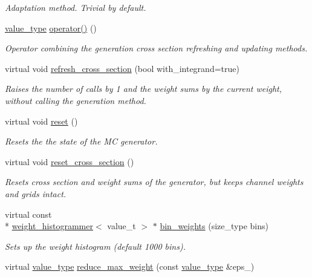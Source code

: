 \begin{DoxyCompactItemize}
\begin{DoxyCompactList}\small\item\em Adaptation method. Trivial by default. \end{DoxyCompactList}\item 
\hyperlink{a00362_a3353150105036deac9bde097cbf1d8af}{value\-\_\-type} \hyperlink{a00362_ae34c9d10ce5d16dc83b20a5179ba20ee}{operator()} ()
\begin{DoxyCompactList}\small\item\em Operator combining the generation cross section refreshing and updating methods. \end{DoxyCompactList}\item 
virtual void \hyperlink{a00362_a5d92f7676d21574ed14d82da458d7452}{refresh\-\_\-cross\-\_\-section} (bool with\-\_\-integrand=true)
\begin{DoxyCompactList}\small\item\em Raises the number of calls by 1 and the weight sums by the current weight, without calling the generation method. \end{DoxyCompactList}\item 
virtual void \hyperlink{a00362_a96247247800b9db50ddf7fafb28aca42}{reset} ()
\begin{DoxyCompactList}\small\item\em Resets the the state of the M\-C generator. \end{DoxyCompactList}\item 
virtual void \hyperlink{a00362_a1ec9818cc8260e1be5c568d319cb722b}{reset\-\_\-cross\-\_\-section} ()
\begin{DoxyCompactList}\small\item\em Resets cross section and weight sums of the generator, but keeps channel weights and grids intact. \end{DoxyCompactList}\item 
\hypertarget{a00362_a61c3ff75a7477c80680c1be16f03e8ca}{virtual const \\*
\hyperlink{a00576}{weight\-\_\-histogrammer}$<$ value\-\_\-t $>$ $\ast$ \hyperlink{a00362_a61c3ff75a7477c80680c1be16f03e8ca}{bin\-\_\-weights} (size\-\_\-type bins)}\label{a00362_a61c3ff75a7477c80680c1be16f03e8ca}

\begin{DoxyCompactList}\small\item\em Sets up the weight histogram (default 1000 bins). \end{DoxyCompactList}\item 
\hypertarget{a00362_a57515bec88ad50bcaa6584b788c136fb}{virtual \hyperlink{a00362_a3353150105036deac9bde097cbf1d8af}{value\-\_\-type} \hyperlink{a00362_a57515bec88ad50bcaa6584b788c136fb}{reduce\-\_\-max\-\_\-weight} (const \hyperlink{a00362_a3353150105036deac9bde097cbf1d8af}{value\-\_\-type} \&eps\-\_\-)}\label{a00362_a57515bec88ad50bcaa6584b788c136fb}


\end{DoxyCompactItemize}
